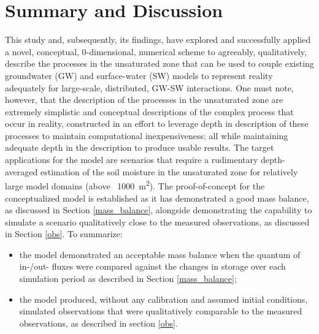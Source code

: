 \chapter{Summary and Discussion}
\label{summary}
This study and, subsequently, its findings, have explored and successfully applied a novel, conceptual, 0-dimensional, numerical scheme to agreeably, qualitatively, describe the processes in the unsaturated zone  that can be used to couple existing groundwater (GW) and surface-water (SW) models to represent reality adequately for large-scale, distributed, GW-SW interactions. One must note, however, that the description of the processes in the unsaturated zone are extremely simplistic and conceptual descriptions of the complex process that occur in reality, constructed in an effort to leverage depth in description of these processes to maintain computational inexpensiveness; all while maintaining adequate depth in the description to produce usable results. The target applications for the model are scenarios that require a rudimentary depth-averaged estimation of the soil moisture in the unsaturated zone for relatively large model domains (above ~\SI{1000}{\metre\squared}). The proof-of-concept for the conceptualized model is established as it has demonstrated a good mass balance, as discussed in Section \ref{mass_balance}, alongside demonstrating the capability to simulate a scenario qualitatively close to the measured observations,  as discussed in Section \ref{obs}. To summarize:
\begin{itemize}
    \item the model demonstrated an acceptable mass balance when the quantum of in-/out- fluxes were compared against the changes in storage over each simulation period as described in Section \ref{mass_balance};
    \item the model produced, without any calibration and assumed initial conditions, simulated observations that were qualitatively comparable to the measured observations, as described in section \ref{obs}.
\end{itemize}



